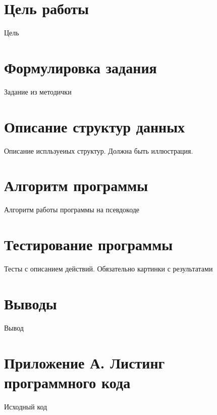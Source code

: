\documentclass[12pt,a4paper]{article}  %
\begin{document}
	\section*{Цель работы}
	
	Цель
	
	\section*{Формулировка задания}
	
	Задание из методички
	
	\section*{Описание структур данных}
	
	Описание испльзуеиых структур. Должна быть иллюстрация.

	
	\section*{Алгоритм программы}
	
	Алгоритм работы программы на псевдокоде
	
	
	\section*{Тестирование программы}
	
	Тесты с описанием действий. Обязательно картинки с результатами

	\section*{Выводы}
	
	Вывод
	
	\newpage
	\section*{Приложение А. Листинг программного кода}
	
	Исходный код
\end{document}
